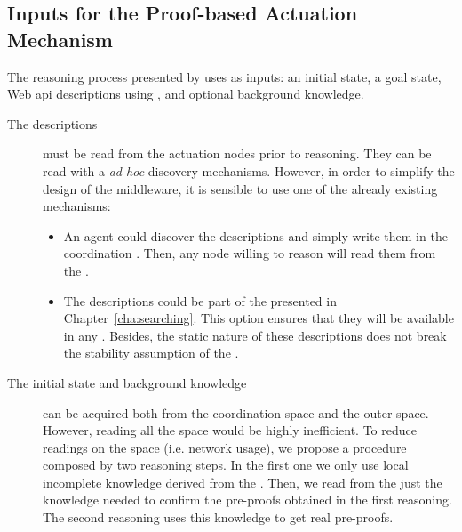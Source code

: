 \subsection{Inputs for the Proof-based Actuation Mechanism}
\label{sec:inputs_proof}

The reasoning process presented by \citet{verborgh_ijcs_2014} uses as inputs: %
an initial state,
a goal state,
Web \ac{api} descriptions using \restdesc{}, and
optional background knowledge.


\begin{description}
  \item[The descriptions] must be read from the actuation nodes prior to reasoning. %
        They can be read with a \emph{ad hoc} discovery mechanisms.
        However, in order to simplify the design of the middleware, it is sensible to use one of the already existing mechanisms:
        
        \begin{itemize}
	  \item An agent could discover the descriptions and simply write them in the coordination \Space{}. %
		Then, any node willing to reason will read them from the \Space{}.
	  \item The descriptions could be part of the \clues{} presented in Chapter~\ref{cha:searching}.
		This option ensures that they will be available in any \consumer{}.
		Besides, the static nature of these descriptions does not break the stability assumption of the \clues{}. %
        \end{itemize}

  \item[The initial state and background knowledge] can be acquired both from the coordination space and the outer space.
	However, reading all the space would be highly inefficient.
	To reduce readings on the space (i.e. network usage), we propose a procedure composed by two reasoning steps.
	In the first one we only use local incomplete knowledge derived from the \clues{}.
	Then, we read from the \Space{} just the knowledge needed to confirm the pre-proofs obtained in the first reasoning.
	The second reasoning uses this knowledge to get real pre-proofs. %
	

\end{description}
